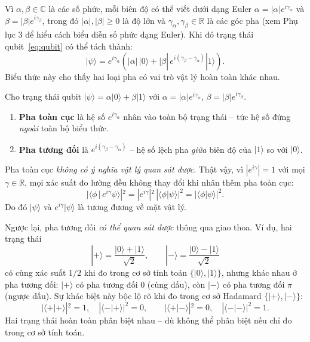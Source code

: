 Vì $\alpha, \beta \in \mathbb{C}$ là các số phức, mỗi biên độ có thể viết dưới
dạng Euler $\alpha = |\alpha|e^{i\gamma_\alpha}$ và
$\beta = |\beta|e^{i\gamma_\beta}$, trong đó $|\alpha|, |\beta| \geq 0$ là độ
lớn và $\gamma_\alpha, \gamma_\beta \in \mathbb{R}$ là các góc pha
(xem Phụ lục 3 để hiểu cách biểu diễn số phức dạng Euler).
Khi đó trạng thái qubit~\eqref{eq:qubit} có thể tách thành:
$$|\psi\rangle
= e^{i\gamma_\alpha}\!\left(|\alpha|\,|0\rangle
+ |\beta|\,e^{i(\gamma_\beta - \gamma_\alpha)}|1\rangle\right).$$
Biểu thức này cho thấy hai loại pha có vai trò vật lý hoàn toàn khác nhau.

\begin{definition}
\label{def:phase}
Cho trạng thái qubit $|\psi\rangle = \alpha|0\rangle + \beta|1\rangle$ với
$\alpha = |\alpha|e^{i\gamma_\alpha}$, $\beta = |\beta|e^{i\gamma_\beta}$.
\begin{enumerate}[label=(\roman*)]
    \item \textbf{Pha toàn cục} là hệ số $e^{i\gamma_\alpha}$ nhân vào toàn bộ
          trạng thái -- tức hệ số đứng \emph{ngoài} toàn bộ biểu thức.
    \item \textbf{Pha tương đối} là $e^{i(\gamma_\beta - \gamma_\alpha)}$ --
          hệ số lệch pha \emph{giữa} biên độ của $|1\rangle$ so với $|0\rangle$.
\end{enumerate}
\end{definition}

\begin{remark}
Pha toàn cục \emph{không có ý nghĩa vật lý quan sát được}. Thật vậy, vì
$|e^{i\gamma}| = 1$ với mọi $\gamma \in \mathbb{R}$, mọi xác suất đo lường đều
không thay đổi khi nhân thêm pha toàn cục:
$$|\langle\phi\,|\,e^{i\gamma}\psi\rangle|^2
= |e^{i\gamma}|^2\,|\langle\phi|\psi\rangle|^2
= |\langle\phi|\psi\rangle|^2.$$
Do đó $|\psi\rangle$ và $e^{i\gamma}|\psi\rangle$ là tương đương về mặt vật lý.

Ngược lại, pha tương đối \emph{có thể quan sát được} thông qua giao thoa. Ví dụ,
hai trạng thái
$$|{+}\rangle = \frac{|0\rangle + |1\rangle}{\sqrt{2}}, \qquad
  |{-}\rangle = \frac{|0\rangle - |1\rangle}{\sqrt{2}}$$
có cùng xác suất $1/2$ khi đo trong cơ sở tính toán $\{|0\rangle, |1\rangle\}$,
nhưng khác nhau ở pha tương đối: $|+\rangle$ có pha tương đối $0$ (cùng dấu),
còn $|-\rangle$ có pha tương đối $\pi$ (ngược dấu). Sự khác biệt này bộc lộ rõ
khi đo trong cơ sở Hadamard $\{|+\rangle, |-\rangle\}$:
$$|\langle{+}|{+}\rangle|^2 = 1, \quad |\langle{-}|{+}\rangle|^2 = 0, \qquad
  |\langle{+}|{-}\rangle|^2 = 0, \quad |\langle{-}|{-}\rangle|^2 = 1.$$
Hai trạng thái hoàn toàn phân biệt nhau -- dù không thể phân biệt nếu chỉ đo
trong cơ sở tính toán. 
\end{remark}

